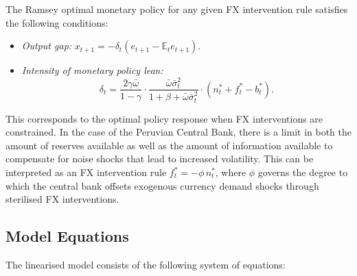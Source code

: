 \documentclass[12pt,a4paper]{article}
\begin{document}
The Ramsey optimal monetary policy for any given FX intervention rule satisfies the following conditions:

\begin{itemize}
    \item \textit{Output gap:} $x_{t+1} = -\delta_t (e_{t+1} - \mathbb{E}_t e_{t+1})$.
    \item \textit{Intensity of monetary policy lean:}
    \[ \delta_t = \frac{2\gamma\bar{\omega}}{1-\gamma} \cdot \frac{\bar{\omega}\bar{\sigma}^2_t}{1 + \beta + \bar{\omega}\bar{\sigma}^2_t} \cdot (n_t^* + f_t^* - b_t^*). \]
\end{itemize}
    
This corresponds to the optimal policy response when FX interventions are constrained. In the case of the Peruvian Central Bank, there is a limit in both the amount of reserves available as well as the amount of information available to compensate for noise shocks that lead to increased volatility. This can be interpreted as an FX intervention rule $f_t^* = -\phi\, n_t^*$, where $\phi$ governs the degree to which the central bank offsets exogenous currency demand shocks through sterilised FX interventions. %

\subsection{Model Equations}

The linearised model consists of the following system of equations:
\end{document}
